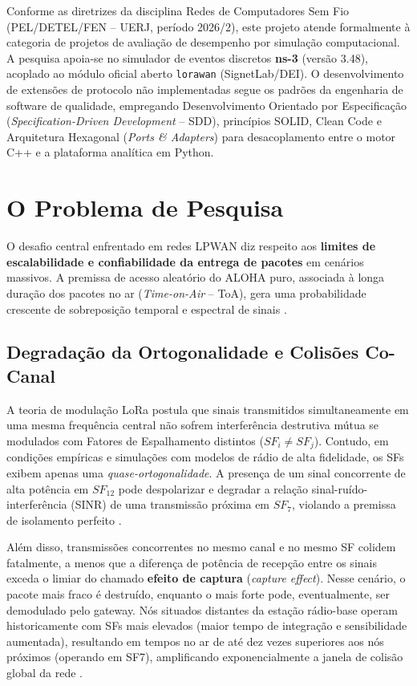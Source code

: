 \documentclass[12pt]{article}
\begin{document}
Conforme as diretrizes da disciplina Redes de Computadores Sem Fio (PEL/DETEL/FEN -- UERJ, período 2026/2), este projeto atende formalmente à categoria de projetos de avaliação de desempenho por simulação computacional. A pesquisa apoia-se no simulador de eventos discretos \textbf{ns-3} (versão 3.48), acoplado ao módulo oficial aberto \texttt{lorawan} (SignetLab/DEI). O desenvolvimento de extensões de protocolo não implementadas segue os padrões da engenharia de software de qualidade, empregando Desenvolvimento Orientado por Especificação (\textit{Specification-Driven Development} -- SDD), princípios SOLID, Clean Code e Arquitetura Hexagonal (\textit{Ports \& Adapters}) para desacoplamento entre o motor C++ e a plataforma analítica em Python.

\section{O Problema de Pesquisa}
\label{sec:problema}

O desafio central enfrentado em redes LPWAN diz respeito aos \textbf{limites de escalabilidade e confiabilidade da entrega de pacotes} em cenários massivos. A premissa de acesso aleatório do ALOHA puro, associada à longa duração dos pacotes no ar (\textit{Time-on-Air} -- ToA), gera uma probabilidade crescente de sobreposição temporal e espectral de sinais \cite{adelantado2017understanding, bor2016lora}. 

\subsection{Degradação da Ortogonalidade e Colisões Co-Canal}
A teoria de modulação LoRa postula que sinais transmitidos simultaneamente em uma mesma frequência central não sofrem interferência destrutiva mútua se modulados com Fatores de Espalhamento distintos ($SF_i \neq SF_j$). Contudo, em condições empíricas e simulações com modelos de rádio de alta fidelidade, os SFs exibem apenas uma \textit{quase-ortogonalidade}. A presença de um sinal concorrente de alta potência em $SF_{12}$ pode despolarizar e degradar a relação sinal-ruído-interferência (SINR) de uma transmissão próxima em $SF_7$, violando a premissa de isolamento perfeito \cite{bor2016lora}.

Além disso, transmissões concorrentes no mesmo canal e no mesmo SF colidem fatalmente, a menos que a diferença de potência de recepção entre os sinais exceda o limiar do chamado \textbf{efeito de captura} (\textit{capture effect}). Nesse cenário, o pacote mais fraco é destruído, enquanto o mais forte pode, eventualmente, ser demodulado pelo gateway. Nós situados distantes da estação rádio-base operam historicamente com SFs mais elevados (maior tempo de integração e sensibilidade aumentada), resultando em tempos no ar de até dez vezes superiores aos nós próximos (operando em SF7), amplificando exponencialmente a janela de colisão global da rede \cite{magrin2017performance}.
\end{document}
